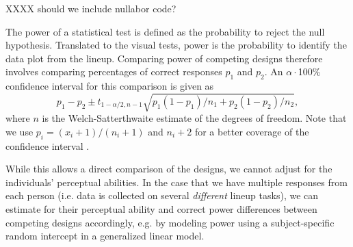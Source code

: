 XXXX should we include nullabor code?

The power of a statistical test is defined as the probability to reject the null hypothesis. Translated to the visual tests, power is the probability to identify the data plot from the lineup. 
Comparing power of competing designs therefore involves comparing percentages of correct responses $p_1$ and $p_2$. An $\alpha\cdot$100\% confidence interval for this comparison is given as 
\[
p_1 - p_2 \pm t_{1-\alpha/2, n-1} \sqrt{p_1(1-p_1)/n_1 + p_2(1-p_2)/n_2},
\]
where $n$ is the Welch-Satterthwaite \cite{welch:1947} estimate of the degrees of freedom. Note that we use $p_i = (x_i+1)/(n_i+1)$ and $n_i+2$ for a better coverage of the confidence interval \cite{agresti:1998}.

While this allows a direct comparison of the designs, we cannot adjust for the individuals' perceptual abilities.
In the case that we have multiple responses from each person (i.e. data is collected on several {\it different} lineup tasks), we can estimate for their perceptual ability and correct power differences between competing designs accordingly, e.g. by modeling power using  a subject-specific random intercept in a generalized linear model.







